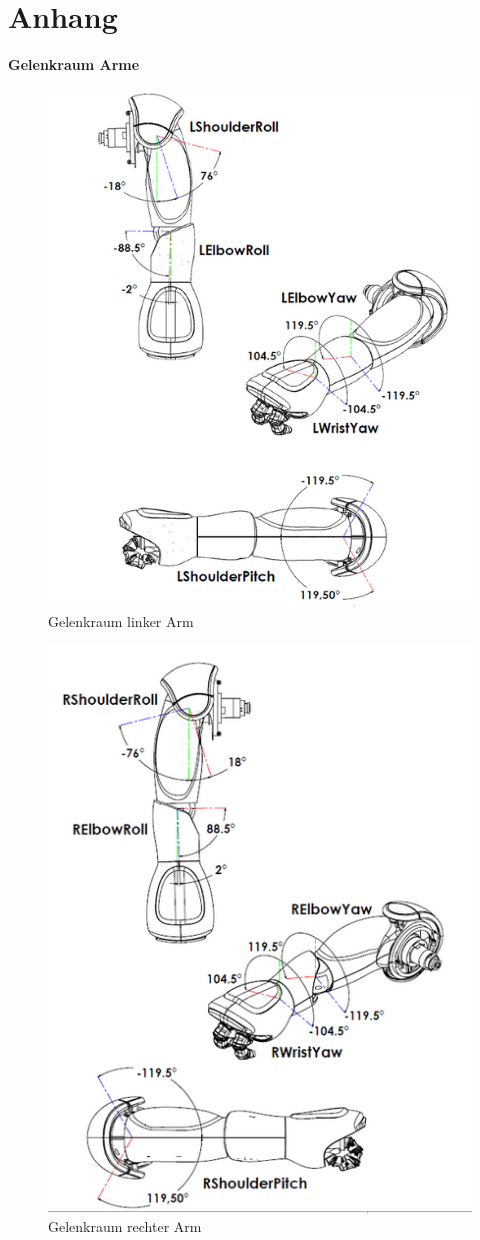 \chapter*{Anhang}
\textbf{Gelenkraum Arme}
\begin{figure}[H]						
	\centering							
	\includegraphics[scale=0.9]{Anhang/GelenkraumLinks.PNG}
	\caption{Gelenkraum linker Arm}
	\label{f:gelenkraumL}										
\end{figure}
\begin{figure}[H]						
	\centering							
	\includegraphics[scale=0.9]{Anhang/GelenkraumRechts.PNG}
	\caption{Gelenkraum rechter Arm}
	\label{f:gelenkraumR}												
\end{figure}

